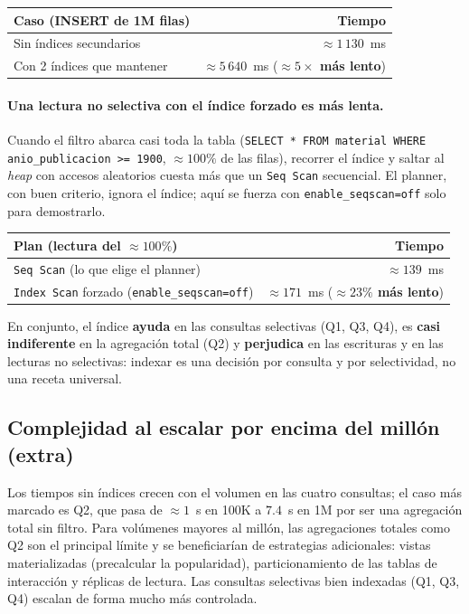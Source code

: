 \documentclass[12pt,a4paper]{article}
\begin{document}
\begin{center}
\begin{tabular}{lr}
\toprule
\textbf{Caso (INSERT de 1M filas)} & \textbf{Tiempo} \\
\midrule
Sin índices secundarios          & $\approx 1\,130$~ms \\
Con 2 índices que mantener       & $\approx 5\,640$~ms \;(\textbf{$\approx 5\times$ más lento}) \\
\bottomrule
\end{tabular}
\end{center}

\paragraph{Una lectura no selectiva con el índice forzado es más lenta.}
Cuando el filtro abarca casi toda la tabla
(\texttt{SELECT * FROM material WHERE anio\_publicacion >= 1900}, $\approx 100\%$
de las filas), recorrer el índice y saltar al \textit{heap} con accesos
aleatorios cuesta más que un \texttt{Seq Scan} secuencial. El planner, con buen
criterio, ignora el índice; aquí se fuerza con \texttt{enable\_seqscan=off} solo
para demostrarlo.

\begin{center}
\begin{tabular}{lr}
\toprule
\textbf{Plan (lectura del $\approx 100\%$)} & \textbf{Tiempo} \\
\midrule
\texttt{Seq Scan} (lo que elige el planner)              & $\approx 139$~ms \\
\texttt{Index Scan} forzado (\texttt{enable\_seqscan=off}) & $\approx 171$~ms \;(\textbf{$\approx 23\%$ más lento}) \\
\bottomrule
\end{tabular}
\end{center}

En conjunto, el índice \textbf{ayuda} en las consultas selectivas (Q1, Q3, Q4),
es \textbf{casi indiferente} en la agregación total (Q2) y \textbf{perjudica} en
las escrituras y en las lecturas no selectivas: indexar es una decisión por
consulta y por selectividad, no una receta universal.


\subsection{Complejidad al escalar por encima del millón (extra)}

Los tiempos sin índices crecen con el volumen en las cuatro consultas; el caso
más marcado es Q2, que pasa de $\approx 1$~s en 100K a $7.4$~s en 1M por ser una
agregación total sin filtro. Para volúmenes mayores al millón, las agregaciones
totales como Q2 son el principal límite y se beneficiarían de estrategias
adicionales: vistas materializadas (precalcular la popularidad), particionamiento
de las tablas de interacción y réplicas de lectura. Las consultas selectivas bien
indexadas (Q1, Q3, Q4) escalan de forma mucho más controlada.
\end{document}
